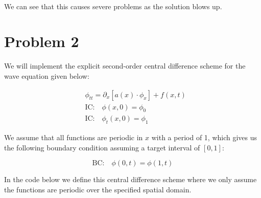 \documentclass[11pt]{article}
\begin{document}
    \begin{center}
    \end{center}
    { \hspace*{\fill} \\}
    
    We can see that this causes severe problems as the solution blows up.

    \hypertarget{problem-2}{%
\section{Problem 2}\label{problem-2}}

    We will implement the explicit second-order central difference scheme
for the wave equation given below:

\begin{align}
&\phi_{tt}=\partial_x[a(x)\cdot\phi_x]+f(x,t)\\
&\text{IC:}\quad\phi(x,0)=\phi_0\\
&\text{IC:}\quad\phi_t(x,0)=\phi_1 
\end{align}

We assume that all functions are periodic in \(x\) with a period of 1,
which gives us the following boundary condition assuming a target
interval of \([0,1]\):

\[ \text{BC:}\quad \phi(0,t)=\phi(1,t) \]

    In the code below we define this central difference scheme where we only
assume the functions are periodic over the specified spatial domain.
\end{document}
